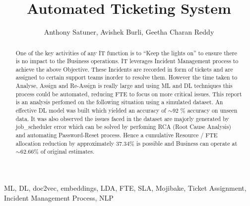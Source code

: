 \documentclass{paper}
\title{Automated Ticketing System}
\author{Anthony Satuner, Avishek Burli, Geetha Charan Reddy}
\begin{document}
    \maketitle
    \begin{abstract}
        One  of  the  key  activities  of  any  IT  function  is  to  “Keep  the  lights on” to ensure there is no impact to the Business operations. IT leverages Incident Management process to achieve the above Objective. These Incidents are recorded in form of tickets and are assigned to certain support teams inorder to resolve them. However the time taken to Analyse, Assign and Re-Assign is really large and using ML and DL techniques this process could be automated, reducing FTE to focus on more critical issues. This report is an analysis perfomed on the following situation using a simulated dataset. An effective DL model was built which yielded an accuracy of $\sim$92 \% accuracy on unseen data. It was also observed the issues faced in the dataset are majorly generated by job\_scheduler error which can be solved by perfoming RCA (Root Cause Analysis) and automating Password-Reset process. Hence a cumulative  Resource / FTE  allocation  reduction  by  approximately  37.34\% is possible and Business can operate at $\sim$62.66\% of original estimates.
    \end{abstract}
    
    \begin{keywords}
        ML, DL, doc2vec, embeddings, LDA, FTE, SLA, Mojibake, Ticket Assignment, Incident Management Process, NLP
    \end{keywords}

    
    
    
    
    
    

    \nocite{*}
    \newpage
    
    \begin{multicols}{2}
    
    \end{multicols}
\end{document}
